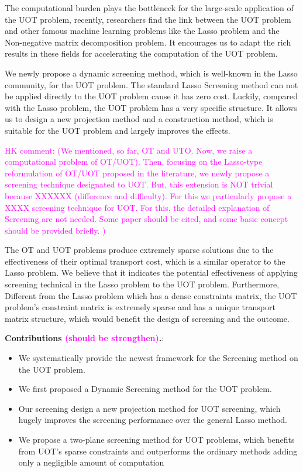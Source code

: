 \documentclass[twoside]{article}
\theoremstyle{plain}
\newcommand{\note}[1]{\textcolor{magenta}{#1}}
\begin{document}
The computational burden plays the bottleneck for the large-scale application of the UOT problem, recently, researchers find the link between the UOT problem and other famous machine learning problems like the Lasso problem and the Non-negative matrix decomposition problem. It encourages us to adapt the rich results in these fields for accelerating the computation of the UOT problem.

We newly propose a dynamic screening method, which is well-known in the Lasso community, for the UOT problem. The standard Lasso Screening method can not be applied directly to the UOT problem cause it has zero cost. Luckily, compared with the Lasso problem, the UOT problem has a very specific structure. It allows us to design a new projection method and a construction method, which is suitable for the UOT problem and largely improves the effects.     


\note{HK comment: (We mentioned, so far, OT and UTO. Now, we raise a computational problem of OT/UOT). Then, focusing on the Lasso-type reformulation of OT/UOT proposed in the literature, we newly propose a screening technique designated to UOT. But, this extension is NOT trivial because XXXXXX (difference and difficulty). For this we particularly propose a XXXX screening technique for UOT. For this, the detailed explanation  of Screening are not needed. Some paper should be cited, and some basic concept should be provided briefly. ) }


The OT and UOT problems produce extremely sparse solutions due to the effectiveness of their optimal transport cost, which is a similar operator to the Lasso problem. We believe that it indicates the potential effectiveness of applying screening technical in the Lasso problem to the UOT problem. Furthermore, Different from the Lasso problem which has a dense constraints matrix, the UOT problem's constraint matrix is extremely sparse and has a unique transport matrix structure, which would benefit the design of screening and the outcome.


\textbf{Contributions \note{(should be strengthen)}.}: 
\begin{itemize}
\item We systematically provide the newest framework for the Screening method on the UOT problem. 
\item We first proposed a Dynamic Screening method for the UOT problem.   
\item Our screening design a new projection method for UOT screening, which hugely improves the screening performance over the general Lasso method.
\item We propose a two-plane screening method for UOT problems, which benefits from UOT's sparse constraints and outperforms the ordinary methods adding only a negligible amount of computation
\end{itemize}
\end{document}
